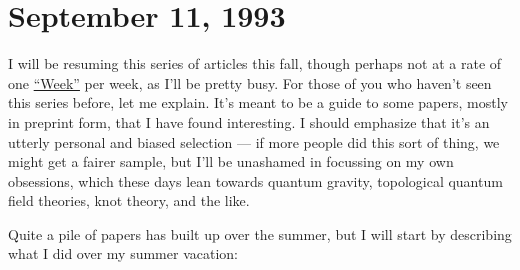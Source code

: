 \documentclass{article}
\begin{document}
\hypertarget{week18}{%
\section{September 11, 1993}\label{week18}}

I will be resuming this series of articles this fall, though perhaps not
at a rate of one \protect\hyperlink{week}{``Week''} per week, as I'll be
pretty busy. For those of you who haven't seen this series before, let
me explain. It's meant to be a guide to some papers, mostly in preprint
form, that I have found interesting. I should emphasize that it's an
utterly personal and biased selection --- if more people did this sort
of thing, we might get a fairer sample, but I'll be unashamed in
focussing on my own obsessions, which these days lean towards quantum
gravity, topological quantum field theories, knot theory, and the like.

Quite a pile of papers has built up over the summer, but I will start by
describing what I did over my summer vacation:
\end{document}
